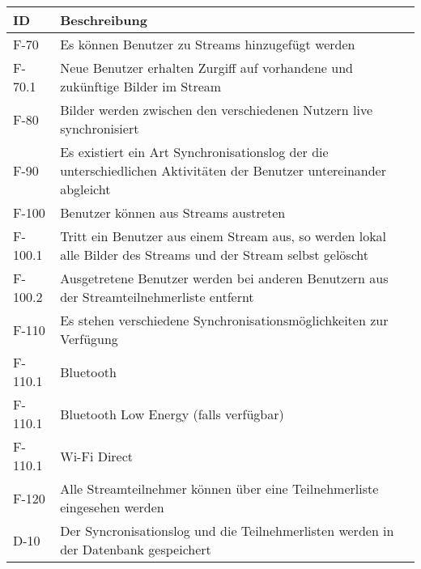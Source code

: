 \begin{center}
\begin{longtable}{|l|p{12cm}|}
\toprule
\textbf{ID} & \textbf{Beschreibung} \\
\hline
\endhead
\hline
\endfoot
F-70 & Es können Benutzer zu Streams hinzugefügt werden\\
F-70.1 & Neue Benutzer erhalten Zurgiff auf vorhandene und zukünftige Bilder im Stream\\
F-80 & Bilder werden zwischen den verschiedenen Nutzern live synchronisiert\\
F-90 & Es existiert ein Art Synchronisationslog der die unterschiedlichen Aktivitäten der Benutzer untereinander abgleicht\\
F-100 & Benutzer können aus Streams austreten \\
F-100.1 & Tritt ein Benutzer aus einem Stream aus, so werden lokal alle Bilder des Streams und der Stream selbst gelöscht\\
F-100.2 & Ausgetretene Benutzer werden bei anderen Benutzern aus der Streamteilnehmerliste entfernt\\
F-110 & Es stehen verschiedene Synchronisationsmöglichkeiten zur Verfügung\\
F-110.1 & Bluetooth\\
F-110.1 & Bluetooth Low Energy (falls verfügbar)\\
F-110.1 & Wi-Fi Direct\\
F-120 & Alle Streamteilnehmer können über eine Teilnehmerliste eingesehen werden\\
\hline
D-10 & Der Syncronisationslog und die Teilnehmerlisten werden in der Datenbank gespeichert\\
\hline

\end{longtable}
\end{center}